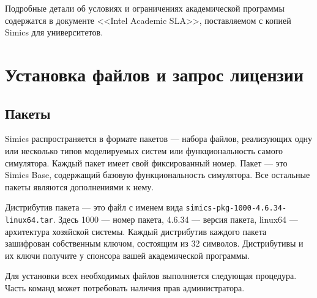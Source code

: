 Подробные детали об условиях и ограничениях академической программы содержатся в документе <<Intel Academic SLA>>, поставляемом с копией Simics для университетов.

\section{Установка файлов и запрос лицензии}

\subsection{Пакеты}

Simics распространяется в формате пакетов --- набора файлов, реализующих одну или несколько типов моделируемых систем или функциональность самого симулятора. Каждый пакет имеет свой фиксированный номер. Пакет  --- это Simics Base, содержащий базовую функциональность симулятора. Все остальные пакеты являются дополнениями к нему.

Дистрибутив пакета --- это файл с именем вида \texttt{simics-pkg-1000-4.6.34-linux64.tar}.  Здесь 1000 --- номер пакета, 4.6.34 --- версия пакета, linux64 --- архитектура хозяйской системы. Каждый дистрибутив каждого пакета зашифрован собственным ключом, состоящим из 32 символов. Дистрибутивы и их ключи получите у спонсора вашей академической программы.

Для установки всех необходимых файлов выполняется следующая процедура. Часть команд может потребовать наличия прав администратора.

